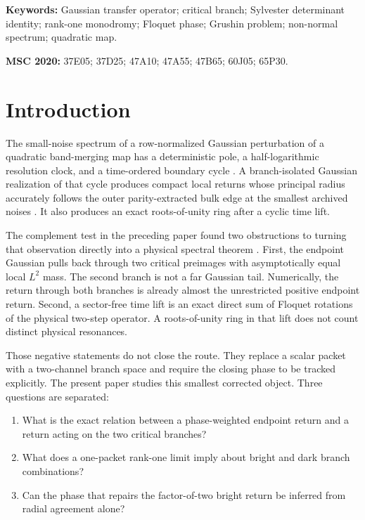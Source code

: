 \documentclass[11pt]{article}
\theoremstyle{definition}
\theoremstyle{remark}
\begin{document}
\noindent\textbf{Keywords:} Gaussian transfer operator; critical branch;
Sylvester determinant identity; rank-one monodromy; Floquet phase; Grushin
problem; non-normal spectrum; quadratic map.

\medskip
\noindent\textbf{MSC 2020:} 37E05; 37D25; 47A10; 47A55; 47B65; 60J05;
65P30.

\section{Introduction}
\label{sec:introduction}

The small-noise spectrum of a row-normalized Gaussian perturbation of a
quadratic band-merging map has a deterministic pole, a half-logarithmic
resolution clock, and a time-ordered boundary cycle
\citep{WangBoundaryLayer2026,WangBulkScattering2026,WangEndpointRank2026,
WangTimeOrdered2026}.  A branch-isolated Gaussian realization of that cycle
produces compact local returns whose principal radius accurately follows the
outer parity-extracted bulk edge at the smallest archived noises
\citep{WangGaussianReturn2026}.  It also produces an exact roots-of-unity
ring after a cyclic time lift.

The complement test in the preceding paper found two obstructions to turning
that observation directly into a physical spectral theorem
\citep{WangComplement2026}.  First, the endpoint Gaussian pulls back through
two critical preimages with asymptotically equal local $L^2$ mass.  The
second branch is not a far Gaussian tail.  Numerically, the return through
both branches is already almost the unrestricted positive endpoint return.
Second, a sector-free time lift is an exact direct sum of Floquet rotations
of the physical two-step operator.  A roots-of-unity ring in that lift does
not count distinct physical resonances.

Those negative statements do not close the route.  They replace a scalar
packet with a two-channel branch space and require the closing phase to be
tracked explicitly.  The present paper studies this smallest corrected
object.  Three questions are separated:
\begin{enumerate}[label=(\roman*),leftmargin=2.4em]
 \item What is the exact relation between a phase-weighted endpoint return
 and a return acting on the two critical branches?
 \item What does a one-packet rank-one limit imply about bright and dark
 branch combinations?
 \item Can the phase that repairs the factor-of-two bright return be inferred
 from radial agreement alone?
\end{enumerate}
\end{document}
